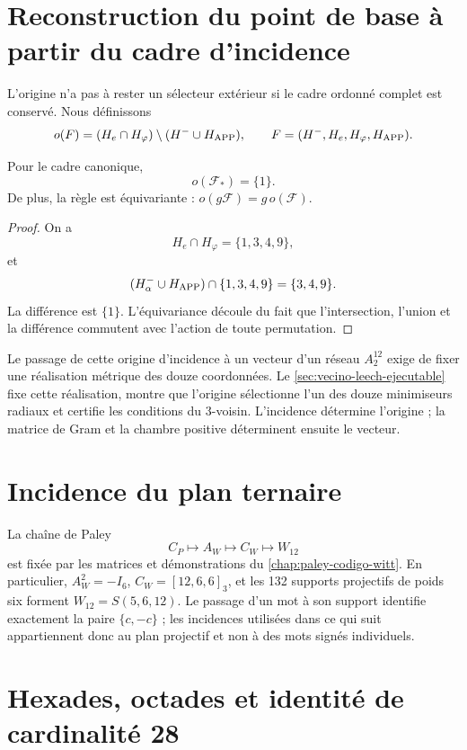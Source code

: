 \section{Reconstruction du point de base à partir du cadre d'incidence}

L'origine n'a pas à rester un sélecteur extérieur si le cadre
ordonné complet est conservé. Nous définissons
\[
o(\mathcal F)
=(H_e\cap H_\varphi)\setminus(H^-\cup H_{\rm APP}),
\qquad
\mathcal F=(H^-,H_e,H_\varphi,H_{\rm APP}).
\]

\begin{theorem}
Pour le cadre canonique,
\[
o(\mathcal F_*)=\{1\}.
\]
De plus, la règle est équivariante : \(o(g\mathcal F)=g\,o(\mathcal F)\).
\end{theorem}

\begin{proof}
On a
\[
H_e\cap H_\varphi=\{1,3,4,9\},
\]
et
\[
(H^-_\alpha\cup H_{\rm APP})\cap\{1,3,4,9\}
=\{3,4,9\}.
\]
La différence est \(\{1\}\). L'équivariance découle du fait que l'intersection,
l'union et la différence commutent avec l'action de toute permutation.
\end{proof}

Le passage de cette origine d'incidence à un vecteur d'un réseau
\(A_2^{12}\) exige de fixer une réalisation métrique des douze coordonnées.
Le \cref{sec:vecino-leech-ejecutable} fixe cette réalisation, montre
que l'origine sélectionne l'un des douze minimiseurs radiaux et certifie
les conditions du 3-voisin. L'incidence détermine l'origine ; la matrice de
Gram et la chambre positive déterminent ensuite le vecteur.

\section{Incidence du plan ternaire}

La chaîne de Paley
\[
C_P\longmapsto A_W\longmapsto C_W\longmapsto W_{12}
\]
est fixée par les matrices et démonstrations du
\cref{chap:paley-codigo-witt}. En particulier,
\(A_W^2=-I_6\), \(C_W=[12,6,6]_3\), et les 132 supports projectifs de
poids six forment \(W_{12}=S(5,6,12)\). Le passage d'un mot à son support
identifie exactement la paire \(\{c,-c\}\) ; les incidences utilisées dans ce
qui suit appartiennent donc au plan projectif et non à des mots
signés individuels.

\section{Hexades, octades et identité de cardinalité 28}


